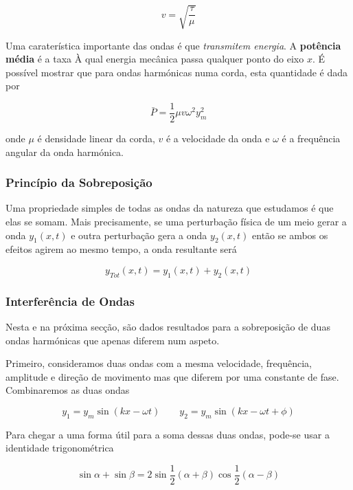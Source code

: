 \begin{equation}
    v=\sqrt{\frac{\tau}{\mu}}
\end{equation}

Uma caraterística importante das ondas é que \emph{transmitem energia}. A \textbf{potência média} é a taxa À qual energia mecânica passa qualquer ponto do eixo $x$. É possível mostrar que para ondas harmónicas numa corda, esta quantidade é dada por

\begin{equation}
    \bar{P}=\frac{1}{2}\mu v\omega^2y_m^2
\end{equation}

onde $\mu$ é densidade linear da corda, $v$ é a velocidade da onda e $\omega$ é a frequência angular da onda harmónica.

\subsubsection{Princípio da Sobreposição}
Uma propriedade simples de todas as ondas da natureza que estudamos é que elas se somam. Mais precisamente, se uma perturbação física de um meio gerar a onda $y_1(x,t)$ e outra perturbação gera a onda $y_2(x,t)$ então se ambos os efeitos agirem ao mesmo tempo, a onda resultante será

\begin{equation}
    y_{Tot}(x,t)=y_1(x,t)+y_2(x,t)
\end{equation}

\subsubsection{Interferência de Ondas}
Nesta e na próxima secção, são dados resultados para a sobreposição de duas ondas harmónicas que apenas diferem num aspeto.

Primeiro, consideramos duas ondas com a mesma velocidade, frequência, amplitude e direção de movimento mas que diferem por uma constante de fase. Combinaremos as duas ondas

\begin{equation}
    y_1=y_m\sin(kx-\omega t) \qquad y_2=y_m\sin(kx-\omega t + \phi)
\end{equation}

Para chegar a uma forma útil para a soma dessas duas ondas, pode-se usar a identidade trigonométrica

\begin{equation*}
    \sin\alpha+\sin\beta=2\sin\frac{1}{2}(\alpha+\beta)\cos\frac{1}{2}(\alpha-\beta)
\end{equation*}

